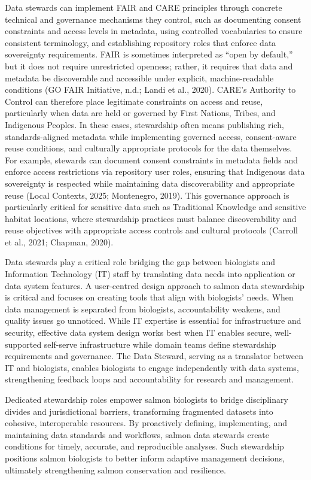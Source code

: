 \documentclass[
  letterpaper,
  DIV=11,
  numbers=noendperiod]{scrartcl}
\begin{document}
Data stewards can implement FAIR and CARE principles through concrete
technical and governance mechanisms they control, such as documenting
consent constraints and access levels in metadata, using controlled
vocabularies to ensure consistent terminology, and establishing
repository roles that enforce data sovereignty requirements. FAIR is
sometimes interpreted as ``open by default,'' but it does not require
unrestricted openness; rather, it requires that data and metadata be
discoverable and accessible under explicit, machine-readable conditions
(GO FAIR Initiative, n.d.; Landi et al., 2020). CARE's Authority to
Control can therefore place legitimate constraints on access and reuse,
particularly when data are held or governed by First Nations, Tribes,
and Indigenous Peoples. In these cases, stewardship often means
publishing rich, standards-aligned metadata while implementing governed
access, consent-aware reuse conditions, and culturally appropriate
protocols for the data themselves. For example, stewards can document
consent constraints in metadata fields and enforce access restrictions
via repository user roles, ensuring that Indigenous data sovereignty is
respected while maintaining data discoverability and appropriate reuse
(Local Contexts, 2025; Montenegro, 2019). This governance approach is
particularly critical for sensitive data such as Traditional Knowledge
and sensitive habitat locations, where stewardship practices must
balance discoverability and reuse objectives with appropriate access
controls and cultural protocols (Carroll et al., 2021; Chapman, 2020).

Data stewards play a critical role bridging the gap between biologists
and Information Technology (IT) staff by translating data needs into
application or data system features. A user-centred design approach to
salmon data stewardship is critical and focuses on creating tools that
align with biologists' needs. When data management is separated from
biologists, accountability weakens, and quality issues go unnoticed.
While IT expertise is essential for infrastructure and security,
effective data system design works best when IT enables secure,
well-supported self-serve infrastructure while domain teams define
stewardship requirements and governance. The Data Steward, serving as a
translator between IT and biologists, enables biologists to engage
independently with data systems, strengthening feedback loops and
accountability for research and management.

Dedicated stewardship roles empower salmon biologists to bridge
disciplinary divides and jurisdictional barriers, transforming
fragmented datasets into cohesive, interoperable resources. By
proactively defining, implementing, and maintaining data standards and
workflows, salmon data stewards create conditions for timely, accurate,
and reproducible analyses. Such stewardship positions salmon biologists
to better inform adaptive management decisions, ultimately strengthening
salmon conservation and resilience.
\end{document}

